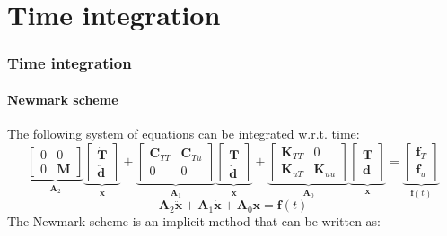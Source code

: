 \documentclass[10pt,xcolor=pdftex,dvipsnames,table]{beamer}
\begin{document}
\section{ Time integration  }

\begin{frame}
	\frametitle{ Time integration }
	\framesubtitle{ Newmark scheme  }
	
	The following system of equations can be integrated w.r.t. time:
	\begin{equation*}
		\underbrace{\begin{bmatrix}
			0 & 0 \\
			0 & \mathbf{M} 
		\end{bmatrix}}_{\mathbf{A}_2}
		\underbrace{\begin{bmatrix}
			\ddot{\boldsymbol{T}} \\
			\ddot{\boldsymbol{d}} 
		\end{bmatrix}}_{\ddot{\boldsymbol{x}}}		
		+
		\underbrace{\begin{bmatrix}
			\mathbf{C}_{TT} & \mathbf{C}_{Tu} \\
			0 & 0 
		\end{bmatrix}}_{\mathbf{A}_1}
		\underbrace{\begin{bmatrix}
			\dot{\boldsymbol{T}} \\
			\dot{\boldsymbol{d}} 
		\end{bmatrix}}_{\dot{\boldsymbol{x}}}
		+
		\underbrace{\begin{bmatrix}
			\mathbf{K}_{TT} & 0 \\
			\mathbf{K}_{uT} & \mathbf{K}_{uu} 
		\end{bmatrix}}_{\mathbf{A}_0}
		\underbrace{\begin{bmatrix}
			\boldsymbol{T} \\
			\boldsymbol{d} 
		\end{bmatrix}}_{\boldsymbol{x}}
		=
		\underbrace{\begin{bmatrix}
			\boldsymbol{f}_T \\
			\boldsymbol{f}_u 
		\end{bmatrix}}_{\boldsymbol{f}(t)}				
	\end{equation*}		
    \begin{equation*}
		\mathbf{A}_2 \ddot{\boldsymbol{x}} +\mathbf{A}_1 \dot{\boldsymbol{x}} +\mathbf{A}_0 \boldsymbol{x} = \boldsymbol{f}(t)
	\end{equation*}
	The Newmark scheme is an implicit method that can be written as:

\end{frame}
\end{document}
